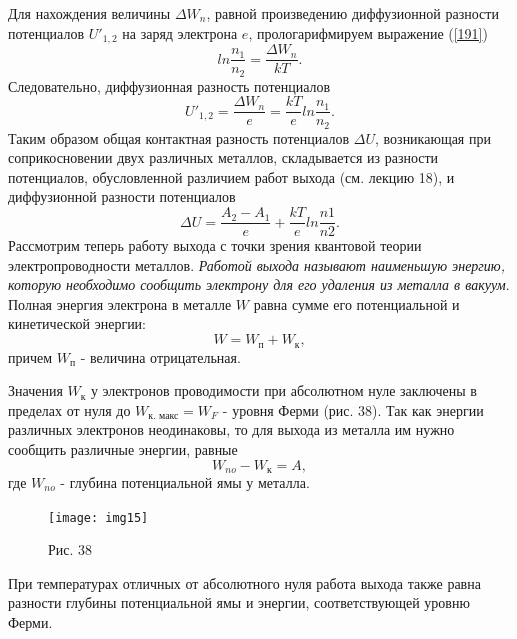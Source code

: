 \documentclass[a4paper,10pt]{book}
\begin{document}
Для нахождения величины $\Delta W_n$, равной произведению диффузионной разности потенциалов $U'_{1,2}$ на заряд электрона $e$, прологарифмируем выражение (\ref{191})
\begin{equation}\label{192}
ln\frac{n_1}{n_2} = \frac{\Delta W_n}{kT}. 
\end{equation}
Следовательно, диффузионная разность потенциалов
\begin{equation}\label{193}
 U'_{1,2} = \frac{\Delta W_n}{e} = \frac{kT}{e}ln\frac{n_1}{n_2}.
\end{equation}
Таким образом общая контактная разность потенциалов $\Delta U$, возникающая при соприкосновении двух различных металлов, складывается из разности потенциалов, обусловленной различием работ выхода (см. лекцию 18), и диффузионной разности потенциалов
\begin{equation}\label{194}
 \Delta U = \frac{A_2 - A_1}{e} + \frac{kT}{e}ln\frac{n1}{n2}.
\end{equation}
Рассмотрим теперь работу выхода с точки зрения квантовой теории электропроводности металлов. \emph{Работой выхода называют наименьшую энергию, которую необходимо сообщить электрону для его удаления из металла в вакуум}. Полная энергия электрона в металле $W$ равна сумме его потенциальной и кинетической энергии:
\begin{equation*}
 W = W_\text{п} + W_\text{к},
\end{equation*}
причем $W_\text{п}$ - величина отрицательная.

Значения $W_\text{к}$ у электронов проводимости при абсолютном нуле заключены в пределах от нуля до $W_\text{к. макс} = W_F$ - уровня Ферми (рис. 38). Так как энергии различных электронов неодинаковы, то для выхода из металла им нужно сообщить различные энергии, равные 
\begin{equation*}
 W_{no} - W_\text{к} = A,
\end{equation*}
где $W_{no}$ - глубина потенциальной ямы у металла.

\begin{figure}[h]
\texttt{[image: img15]}
\caption{Рис. 38}
\label{img15}
\end{figure}
При температурах отличных от абсолютного нуля работа выхода также равна разности глубины потенциальной ямы и энергии, соответствующей уровню Ферми.
\end{document}
